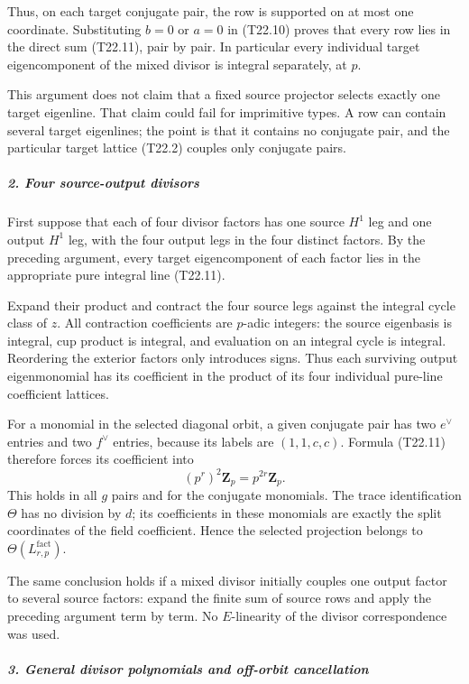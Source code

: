\documentclass[11pt,a4paper]{article}
\theoremstyle{definition}
\begin{document}
Thus, on each target conjugate pair, the row is supported on at most one coordinate. Substituting \(b=0\) or \(a=0\) in (T22.10) proves that every row lies in the direct sum (T22.11), pair by pair. In particular every individual target eigencomponent of the mixed divisor is integral separately, at \(p\).

This argument does not claim that a fixed source projector selects exactly one target eigenline. That claim could fail for imprimitive types. A row can contain several target eigenlines; the point is that it contains no conjugate pair, and the particular target lattice (T22.2) couples only conjugate pairs.

\subparagraph{2. Four source-output divisors}\label{four-source-output-divisors}

First suppose that each of four divisor factors has one source \(H^1\) leg and one output \(H^1\) leg, with the four output legs in the four distinct factors. By the preceding argument, every target eigencomponent of each factor lies in the appropriate pure integral line (T22.11).

Expand their product and contract the four source legs against the integral cycle class of \(z\). All contraction coefficients are \(p\)-adic integers: the source eigenbasis is integral, cup product is integral, and evaluation on an integral cycle is integral. Reordering the exterior factors only introduces signs. Thus each surviving output eigenmonomial has its coefficient in the product of its four individual pure-line coefficient lattices.

For a monomial in the selected diagonal orbit, a given conjugate pair has two \(e^\vee\) entries and two \(f^\vee\) entries, because its labels are \((1,1,c,c)\). Formula (T22.11) therefore forces its coefficient into \[
 (p^r)^2\mathbf Z_p=p^{2r}\mathbf Z_p.
\] This holds in all \(g\) pairs and for the conjugate monomials. The trace identification \(\Theta\) has no division by \(d\); its coefficients in these monomials are exactly the split coordinates of the field coefficient. Hence the selected projection belongs to \(\Theta(L^{\mathrm{fact}}_{r,p})\).

The same conclusion holds if a mixed divisor initially couples one output factor to several source factors: expand the finite sum of source rows and apply the preceding argument term by term. No \(E\)-linearity of the divisor correspondence was used.

\subparagraph{3. General divisor polynomials and off-orbit cancellation}\label{general-divisor-polynomials-and-off-orbit-cancellation}
\end{document}
